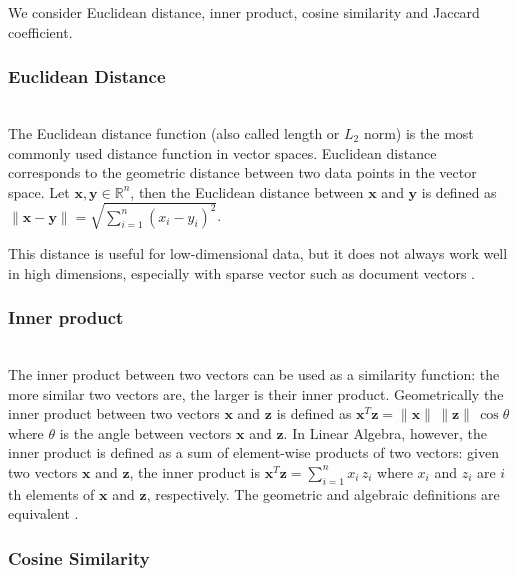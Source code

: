 We consider Euclidean distance, inner product, cosine similarity and
Jaccard coefficient.


\subsubsection{Euclidean Distance} \ \\

The Euclidean distance function (also called length or $L_2$ norm) 
is the most commonly used distance function in vector spaces. 
Euclidean distance corresponds to the geometric distance between two data 
points in the vector space. Let $\mathbf x, \mathbf y \in \mathbb R^n$, then 
the Euclidean distance between $\mathbf x$ and $\mathbf y$ is defined 
as $\| \mathbf x - \mathbf y \| = \sqrt{\sum_{i = 1}^n (x_i - y_i)^2}$.


This distance is useful for low-dimensional data, but it does not always work
well in high dimensions, especially with sparse vector such as
document vectors \cite{ertoz2003finding}.


\subsubsection{Inner product} \ \\

The inner product between two vectors can be used as a similarity function:
the more similar two vectors are, the larger is their inner product.
Geometrically the inner product between two vectors $\mathbf x$ and $\mathbf z$
is defined as
$\mathbf x^T \mathbf z = \|\mathbf x \| \, \| \mathbf z \| \, \cos \theta$
where $\theta$ is the angle between vectors $\mathbf x$ and $\mathbf z$.
In Linear Algebra, however, the inner product
is defined as a sum of element-wise products of two vectors:
given two vectors $\mathbf x$ and $\mathbf z$, the inner product is
$\mathbf x^T \mathbf z = \sum_{i = 1}^n x_i \, z_i$ where $x_i$ and $z_i$
are $i$th elements of $\mathbf x$ and $\mathbf z$, respectively.
The geometric and algebraic definitions are equivalent \cite{huges2013calculus}.



\subsubsection{Cosine Similarity} \label{sec:cosine} \ \\




